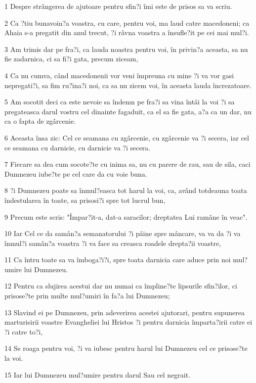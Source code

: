 \par 1 Despre strângerea de ajutoare pentru sfin?i îmi este de prisos sa va scriu.
\par 2 Ca ?tiu bunavoin?a voastra, cu care, pentru voi, ma laud catre macedoneni; ca Ahaia s-a pregatit din anul trecut, ?i râvna voastra a însufle?it pe cei mai mul?i.
\par 3 Am trimis dar pe fra?i, ca lauda noastra pentru voi, în privin?a aceasta, sa nu fie zadarnica, ci sa fi?i gata, precum ziceam,
\par 4 Ca nu cumva, când macedonenii vor veni împreuna cu mine ?i va vor gasi nepregati?i, sa fim ru?ina?i noi, ca sa nu zicem voi, în aceasta lauda încrezatoare.
\par 5 Am socotit deci ca este nevoie sa îndemn pe fra?i sa vina întâi la voi ?i sa pregateasca darul vostru cel dinainte fagaduit, ca el sa fie gata, a?a ca un dar, nu ca o fapta de zgârcenie.
\par 6 Aceasta însa zic: Cel ce seamana cu zgârcenie, cu zgârcenie va ?i secera, iar cel ce seamana cu darnicie, cu darnicie va ?i secera.
\par 7 Fiecare sa dea cum socote?te cu inima sa, nu cu parere de rau, sau de sila, caci Dumnezeu iube?te pe cel care da cu voie buna.
\par 8 ?i Dumnezeu poate sa înmul?easca tot harul la voi, ca, având totdeauna toata îndestularea în toate, sa prisosi?i spre tot lucrul bun,
\par 9 Precum este scris: "Împar?it-a, dat-a saracilor; dreptatea Lui ramâne în veac".
\par 10 Iar Cel ce da samân?a semanatorului ?i pâine spre mâncare, va va da ?i va înmul?i samân?a voastra ?i va face sa creasca roadele drepta?ii voastre,
\par 11 Ca întru toate sa va îmboga?i?i, spre toata darnicia care aduce prin noi mul?umire lui Dumnezeu.
\par 12 Pentru ca slujirea acestui dar nu numai ca împline?te lipsurile sfin?ilor, ci prisose?te prin multe mul?umiri în fa?a lui Dumnezeu;
\par 13 Slavind ei pe Dumnezeu, prin adeverirea acestei ajutorari, pentru supunerea marturisirii voastre Evangheliei lui Hristos ?i pentru darnicia împarta?irii catre ei ?i catre to?i,
\par 14 Se roaga pentru voi, ?i va iubesc pentru harul lui Dumnezeu cel ce prisose?te la voi.
\par 15 Iar lui Dumnezeu mul?umire pentru darul Sau cel negrait.

